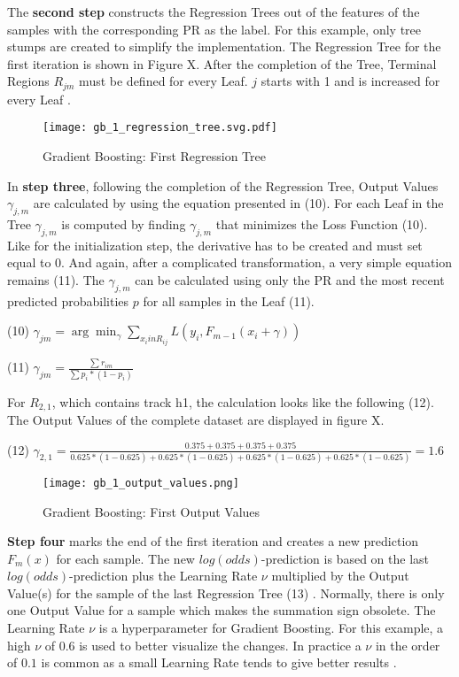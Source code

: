 The \textbf{second step} constructs the Regression Trees out of the features of the samples with the corresponding 
PR as the label. For this example, only tree stumps are created to simplify the implementation. 
The Regression Tree for the first iteration is shown in Figure X. After the completion of the 
Tree, Terminal Regions \(R_{jm}\) must be defined for every Leaf. \(j\) starts with 1 and is increased for 
every Leaf \cite[p.1195]{Friedman_2001}. 

\begin{figure}[H]
    \centering
    \caption[]{Gradient Boosting: First Regression Tree}
	\label{gb_1_regression_tree}
    \texttt{[image: gb\_1\_regression\_tree.svg.pdf]}
\end{figure}

In \textbf{step three}, following the completion of the Regression Tree, Output Values \(\gamma_{j, m}\) are calculated by using 
the equation presented in (10). For each Leaf in the Tree \(\gamma_{j, m}\) is computed by finding 
\(\gamma_{j, m}\) that minimizes the Loss Function (10). Like for the initialization step, the derivative has 
to be created and must set equal to \(0\). And again, after a complicated transformation, a very simple 
equation remains (11). The \(\gamma_{j, m}\)  can be calculated using only the PR and the most 
recent predicted probabilities \(p\) for all samples in the Leaf (11). 

(10) \(\gamma_{jm} = \arg \min_{\gamma}\sum_{x_{i} in R_{ij}} L(y_{i},F_{m-1}(x_{i} + \gamma)) \)

(11) \(\gamma_{jm} = \frac{ \sum r_{im}}{\sum p_{i} * (1 - p_{i})} \) 

For \(R_{2,1}\), which contains track h1, the calculation looks like the following (12). The Output Values of the complete 
dataset are displayed in figure X. 

(12) \(\gamma_{2,1} = \frac{0.375+0.375+0.375+0.375}{0.625 * (1 - 0.625) + 0.625 * (1 - 0.625) + 0.625 * (1 - 0.625) + 0.625 * (1 - 0.625)} 
                    = 1.6 \)

\begin{figure}[H]
    \centering
    \caption[]{Gradient Boosting: First Output Values}
	\label{gb_1_output_values}
    \texttt{[image: gb\_1\_output\_values.png]}
\end{figure}

\textbf{Step four} marks the end of the first iteration and creates a new prediction \(F_{m}(x)\) for each sample. 
The new \(log(odds)\)-prediction is based on the last \(log(odds)\)-prediction plus the Learning Rate \(\nu\) multiplied by 
the Output Value(s) for the sample of the last Regression Tree (13) \cite[p.1203]{Friedman_2001}. Normally, there is only one 
Output Value for a sample which makes the summation sign obsolete. The Learning Rate \(\nu\) is a 
hyperparameter for Gradient Boosting. For this example, a high \(\nu\) of \(0.6\) is used to better visualize 
the changes. In practice a \(\nu \) in the order of \(0.1\) is common as a small Learning Rate tends to
give better results \cite[p.1206]{Friedman_2001}. 

